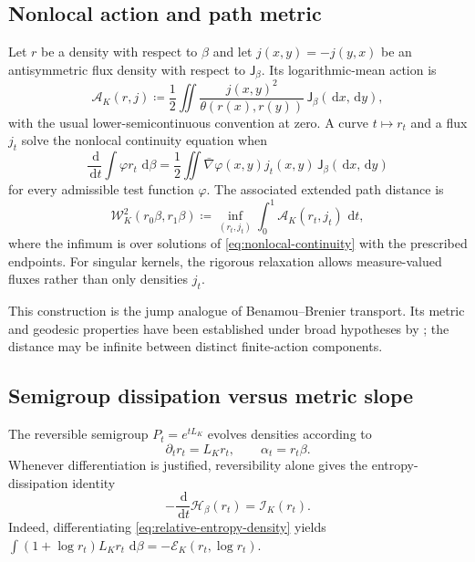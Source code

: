 \documentclass[11pt]{article}
\theoremstyle{definition}
\newcommand{\dd}{\,\mathrm d}
\newcommand{\cE}{\mathcal E}
\newcommand{\cI}{\mathcal I}
\newcommand{\cH}{\mathcal H}
\newcommand{\cW}{\mathcal W}
\newcommand{\Jm}{\mathsf J}
\newcommand{\bgrad}{\bar\nabla}
\begin{document}
\subsection{Nonlocal action and path metric}

Let $r$ be a density with respect to $\beta$ and let $j(x,y)=-j(y,x)$ be an
antisymmetric flux density with respect to $\Jm_\beta$.  Its logarithmic-mean
action is
\begin{equation}\label{eq:nonlocal-action}
  \mathcal A_K(r,j)
  \coloneqq \frac12\iint
  \frac{j(x,y)^2}{\theta(r(x),r(y))}\,
  \Jm_\beta(\dd x,\dd y),
\end{equation}
with the usual lower-semicontinuous convention at zero.  A curve
$t\mapsto r_t$ and a flux $j_t$ solve the nonlocal continuity equation when
\begin{equation}\label{eq:nonlocal-continuity}
  \frac{\dd}{\dd t}\int \varphi r_t\,\dd\beta
  =\frac12\iint \bgrad\varphi(x,y)j_t(x,y)
    \,\Jm_\beta(\dd x,\dd y)
\end{equation}
for every admissible test function $\varphi$.  The associated extended path
distance is
\begin{equation}\label{eq:nonlocal-distance}
  \cW_K^2(r_0\beta,r_1\beta)
  \coloneqq \inf_{(r_t,j_t)}
  \int_0^1\mathcal A_K(r_t,j_t)\,\dd t,
\end{equation}
where the infimum is over solutions of \eqref{eq:nonlocal-continuity} with
the prescribed endpoints.  For singular kernels, the rigorous relaxation
allows measure-valued fluxes rather than only densities $j_t$.

This construction is the jump analogue of Benamou--Brenier transport.  Its
metric and geodesic properties have been established under broad hypotheses
by \citet{Erbar2014JumpEntropy,SlepcevWarren2023}; the distance may be
infinite between distinct finite-action components.

\subsection{Semigroup dissipation versus metric slope}

The reversible semigroup $P_t=e^{tL_K}$ evolves densities according to
\begin{equation}\label{eq:jump-flow}
  \partial_t r_t=L_Kr_t,
  \qquad \alpha_t=r_t\beta.
\end{equation}
Whenever differentiation is justified, reversibility alone gives the
entropy-dissipation identity
\begin{equation}\label{eq:entropy-dissipation}
  -\frac{\dd}{\dd t}\cH_\beta(r_t)=\cI_K(r_t).
\end{equation}
Indeed, differentiating \eqref{eq:relative-entropy-density} yields
$\int(1+\log r_t)L_Kr_t\,\dd\beta=-\cE_K(r_t,\log r_t)$.
\end{document}
